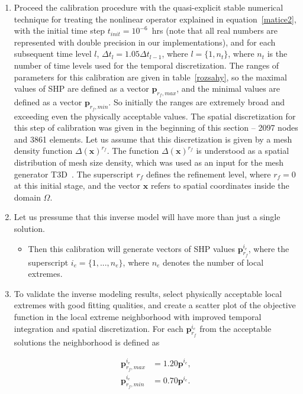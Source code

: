 \documentclass[review,times,3p,twocolumn,10pt]{elsarticle}
\newenvironment{lineq}
    {\begin{linenomath*}
    \begin{equation}
    }
    { 
    \end{equation} 
    \end{linenomath*}
    }
\renewcommand{\vec}{\mathbf}
\begin{document}
 \begin{enumerate}[label=({\bf \roman*})]
\item Proceed the calibration procedure with the quasi-explicit stable numerical technique for treating the nonlinear operator explained in equation~\eqref{matice2}, with the initial time step $t_{init}= 10^{-6}$~hrs (note that all real numbers are represented with double precision in our implementations), and for each subsequent time level $l$, $\Delta t_l = 1.05 \Delta t_{l-1}$, where $l=\{1,n_t\}$, where $n_t$ is the number of time levels used for the temporal discretization. The ranges of parameters for this calibration are given in table~\ref{rozsahy}, so the maximal values of SHP are defined as a vector $\vec{p}_{r_f,max}$, and the minimal values are defined as a vector $\vec{p}_{r_f,min}$. So initially the ranges are extremely broad and exceeding even the physically acceptable values. The spatial discretization for this step of calibration was given in the beginning of this section -- 2097 nodes and 3861 elements. 
Let us assume that this discretization is given by a mesh density function ${\Delta}(\vec{x})^{r_f}$. The function $\Delta(\vec{x})^{r_f}$ is understood as a spatial distribution of mesh size density, which was used as an input for the mesh generator T3D~\citep{t3d}. The superscript $r_f$ defines the refinement level, where $r_f=0$ at this initial stage, and the vector $\vec{x}$ refers to spatial coordinates inside the domain $\Omega$.
\item Let us pressume that this inverse model will have more than just a single solution. \begin{itemize} \item Then this calibration will generate vectors of SHP values $\vec{p}^{i_e}_{r_f}$, where the superscript $i_e=\{1,...,n_e\}$, where $n_e$     denotes the number of  local extremes. \end{itemize} 
\item To validate the inverse modeling results, select physically acceptable local extremes with good fitting qualities, and create a scatter plot of the objective function in the local extreme  neighborhood  with improved temporal integration and spatial discretization. For each $\vec{p}^{i_e}_{r_f}$ from the acceptable solutions the neighborhood is defined as
\begin{lineq}
\begin{split}
\vec{p}^{i_e}_{r_f,max} &= 1.20\vec{p}^{i_e}, \\
\vec{p}^{i_e}_{r_f,min} &= 0.70\vec{p}^{i_e}. 
\end{split}
\end{lineq}



\end{enumerate}
\end{document}
